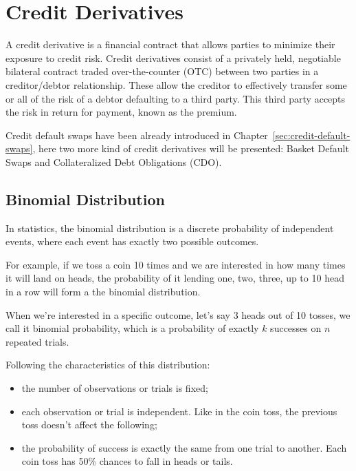 \chapter{Credit Derivatives}

A credit derivative is a financial contract that allows parties to minimize their exposure to credit risk. Credit derivatives consist of a privately held, negotiable bilateral contract traded over-the-counter (OTC) between two parties in a creditor/debtor relationship. These allow the creditor to effectively transfer some or all of the risk of a debtor defaulting to a third party. This third party accepts the risk in return for payment, known as the premium.

Credit default swaps have been already introduced in Chapter~\ref{sec:credit-default-swaps}, here two more kind of credit derivatives will be presented: Basket Default Swaps and Collateralized Debt Obligations (CDO).

\section{Binomial Distribution}
\label{binomial-distribution}

In statistics, the binomial distribution is a discrete probability of independent events, where each event has exactly two possible outcomes.

For example, if we toss a coin 10 times and we are interested in how many times it will land on heads, the probability of it lending one, two, three, up to 10 head in a row will form a the binomial distribution. 

When we're interested in a specific outcome, let's say 3 heads out of 10 tosses, we call it binomial probability, which is a probability of exactly \(k\) successes on \(n\) repeated trials.

Following the characteristics of this distribution:

\begin{itemize}
\tightlist
\item
  the number of observations or trials is fixed;
\item
  each observation or trial is independent. Like in the coin toss, the previous toss doesn't affect the following;
\item
  the probability of success is exactly the same from one trial to another. Each coin toss has 50\% chances to fall in heads or tails.
\end{itemize}

